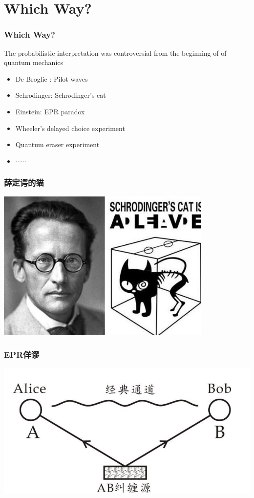 \section{Which Way?}

\begin{frame}
    \frametitle{Which Way?}
    The probabilistic interpretation was controversial from the beginning of of quantum mechanics
    \begin{itemize}
        \item De Broglie : Pilot waves
        \item Schr$\ddot{o}$dinger: Schr$\ddot{o}$dinger's cat
        \item Einstein: EPR paradox
        \item Wheeler's delayed choice experiment
        \item Quantum eraser experiment
        \item $\cdots \cdots$
    \end{itemize}
\end{frame}

\begin{frame}
    \frametitle{薛定谔的猫}
    \begin{center}
        \includegraphics[width=0.8\textwidth]{figs/cat.jpeg} \\
    \end{center} 
\end{frame}

\begin{frame}
    \frametitle{EPR佯谬}
    \begin{center}
        \includegraphics[width=1.0\textwidth]{figs/2022-01-09-14-45-26.png} \\
    \end{center} 
\end{frame}

